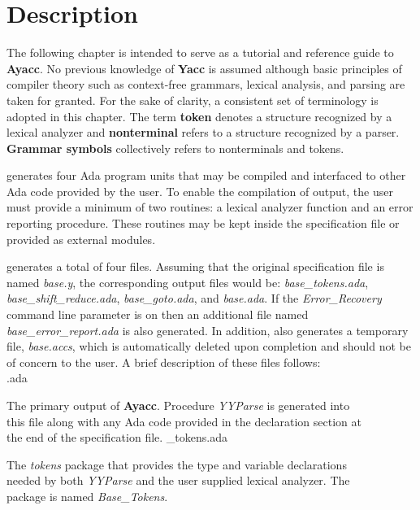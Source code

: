 \section{Description}

The following chapter is intended to serve as a
tutorial and reference guide to {\bf Ayacc\rm}.  No previous knowledge
of {\bf Yacc} is assumed although basic principles of compiler
theory such as context-free grammars, lexical analysis,
and parsing are taken for granted.  For the
sake of clarity, a consistent set of terminology is
adopted in this chapter.  The term {\bf token} denotes a structure
recognized by a lexical analyzer and {\bf nonterminal}
refers to a structure recognized by a parser.  {\bf Grammar symbols}
collectively refers to nonterminals and tokens.

\ayacc generates four Ada program units that may be compiled and
interfaced to other Ada code provided by the user.  To enable
the compilation of \ayacc output, the user
must provide a minimum of two routines: a lexical analyzer
function
and an error reporting procedure.  These routines may be
kept inside the specification file or provided as
external modules.

\ayacc generates a total of four files.  Assuming that the original
specification file is named
{\it base.y},
the corresponding \ayacc output files would be:
{\it base\_tokens.ada},\\
{\it base\_shift\_reduce.ada},
{\it base\_goto.ada},
and
{\it base.ada}.  If the {\it Error\_Recovery} command line parameter is
on then an additional file named {\it base\_error\_report.ada} is also
generated.
In addition, \ayacc also generates a temporary file,
{\it base.accs},
which is automatically deleted upon completion and should not be of concern
to the user.  A brief description of these files follows:
\smallskip\\
.ada

The primary output of {\bf Ayacc}.  Procedure {\it YYParse} is generated into\\
\indent this file along with any Ada code provided in the
declaration section at\\
\indent the end of the specification file.
\newpage
{}\_tokens.ada

\indent The {\it tokens} package that provides the type and variable
declarations\\
\indent  needed by both {\it YYParse} and the user supplied lexical
analyzer.  The\\
\indent  package is named {\it Base\_Tokens}.

